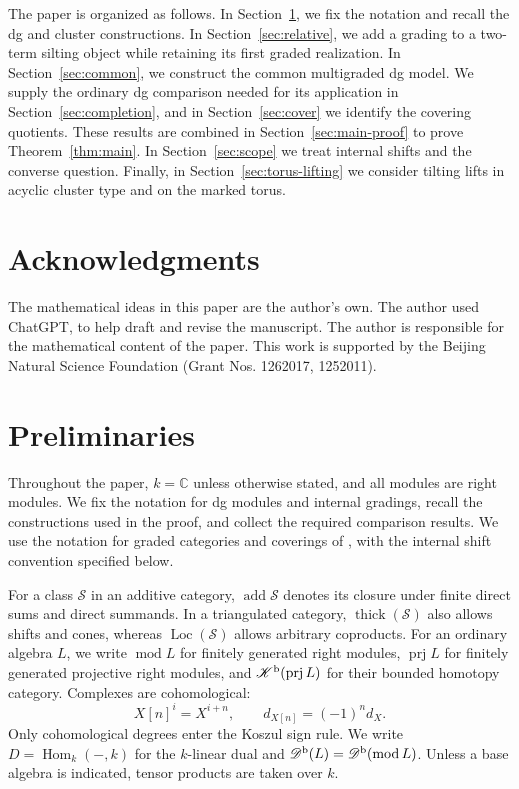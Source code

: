 \documentclass[12pt,a4paper,english,reqno]{amsart}
\theoremstyle{plain}
\theoremstyle{definition}
\numberwithin{equation}{section}
\newcommand{\thmref}[1]{Theorem~\ref{#1}}
\def\Hom{\operatorname{Hom}}
\def\prj{\operatorname{prj}}
\def\thick{\operatorname{thick}}
\def\add{\operatorname{add}}
\def\Kb{{\mathcal K}^{\text{\rm b}}}
\def\Db{{\mathcal D}^{\text{\rm b}}}
\def\bbC{{\mathbb C}}
\def\Loc{\operatorname{Loc}}
\begin{document}
The paper is organized as follows. In Section~\ref{sec:background}, we fix the notation and recall the dg and cluster constructions. In Section~\ref{sec:relative}, we add a grading to a two-term silting object while retaining its first graded realization. In Section~\ref{sec:common}, we construct the common multigraded dg model. We supply the ordinary dg comparison needed for its application in Section~\ref{sec:completion}, and in Section~\ref{sec:cover} we identify the covering quotients. These results are combined in Section~\ref{sec:main-proof} to prove \thmref{thm:main}. In Section~\ref{sec:scope} we treat internal shifts and the converse question. Finally, in Section~\ref{sec:torus-lifting} we consider tilting lifts in acyclic cluster type and on the marked torus.


\section*{Acknowledgments}
The mathematical ideas in this paper are the author's own.
The author used ChatGPT, to help draft and revise the manuscript. The author is responsible
for the mathematical content of the paper.
This work is supported by the Beijing Natural Science Foundation (Grant Nos. 1262017, 1252011).


\section{Preliminaries}\label{sec:background}
Throughout the paper, $k=\bbC$ unless otherwise stated, and all modules
are right modules. We fix the notation for dg modules and internal
gradings, recall the constructions used in the proof, and collect the
required comparison results. We use the notation for graded categories and coverings of \cite{AP},
with the internal shift convention specified below.

For a class $\mathcal S$ in an additive category, $\add\mathcal S$
denotes its closure under finite direct sums and direct summands.
In a triangulated category, $\thick(\mathcal S)$ also allows shifts
and cones, whereas $\Loc(\mathcal S)$ allows arbitrary coproducts.
For an ordinary algebra $L$, we write $\operatorname{mod}L$ for
finitely generated right modules, $\prj L$ for finitely generated
projective right modules, and $\Kb(\prj L)$ for their bounded homotopy
category. Complexes are cohomological:
\[
 X[n]^i=X^{i+n},\qquad d_{X[n]}=(-1)^n d_X.
\]
Only cohomological degrees enter the Koszul sign rule.
We write $D=\Hom_k(-,k)$ for the $k$-linear dual and
$\Db(L)=\Db(\operatorname{mod}L)$. Unless a base algebra is indicated,
tensor products are taken over $k$.
\end{document}
